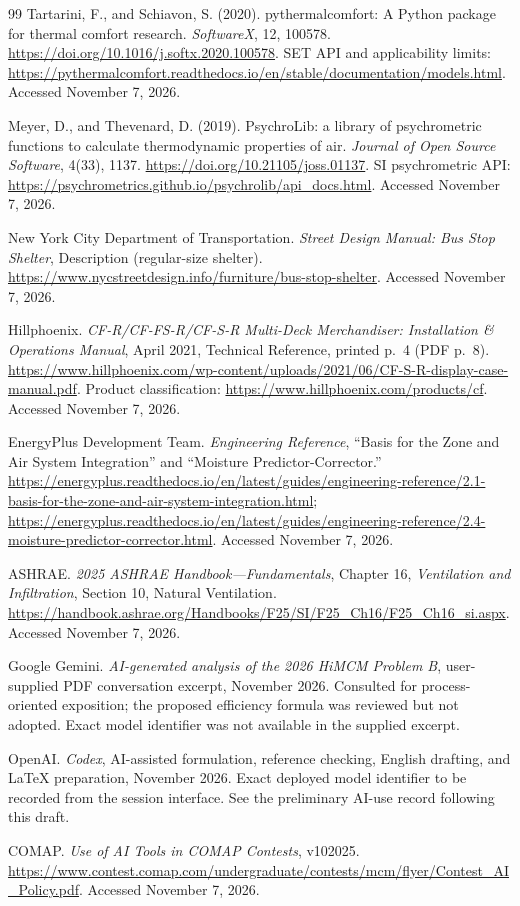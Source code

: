 \documentclass[12pt]{article}
\begin{document}
\begin{thebibliography}{99}
Tartarini, F., and Schiavon, S. (2020).
pythermalcomfort: A Python package for thermal comfort research.
\emph{SoftwareX}, 12, 100578.
\url{https://doi.org/10.1016/j.softx.2020.100578}.
SET API and applicability limits:
\url{https://pythermalcomfort.readthedocs.io/en/stable/documentation/models.html}.
Accessed November 7, 2026.

Meyer, D., and Thevenard, D. (2019).
PsychroLib: a library of psychrometric functions to calculate thermodynamic properties of air.
\emph{Journal of Open Source Software}, 4(33), 1137.
\url{https://doi.org/10.21105/joss.01137}.
SI psychrometric API:
\url{https://psychrometrics.github.io/psychrolib/api_docs.html}.
Accessed November 7, 2026.

New York City Department of Transportation.
\emph{Street Design Manual: Bus Stop Shelter}, Description (regular-size shelter).
\url{https://www.nycstreetdesign.info/furniture/bus-stop-shelter}.
Accessed November 7, 2026.

Hillphoenix. \emph{CF-R/CF-FS-R/CF-S-R Multi-Deck Merchandiser: Installation \& Operations Manual}, April 2021, Technical Reference, printed p.~4 (PDF p.~8).
\url{https://www.hillphoenix.com/wp-content/uploads/2021/06/CF-S-R-display-case-manual.pdf}.
Product classification: \url{https://www.hillphoenix.com/products/cf}.
Accessed November 7, 2026.

EnergyPlus Development Team. \emph{Engineering Reference},
``Basis for the Zone and Air System Integration'' and ``Moisture Predictor-Corrector.''
\url{https://energyplus.readthedocs.io/en/latest/guides/engineering-reference/2.1-basis-for-the-zone-and-air-system-integration.html};
\url{https://energyplus.readthedocs.io/en/latest/guides/engineering-reference/2.4-moisture-predictor-corrector.html}.
Accessed November 7, 2026.

ASHRAE. \emph{2025 ASHRAE Handbook---Fundamentals}, Chapter 16,
\emph{Ventilation and Infiltration}, Section 10, Natural Ventilation.
\url{https://handbook.ashrae.org/Handbooks/F25/SI/F25_Ch16/F25_Ch16_si.aspx}.
Accessed November 7, 2026.

Google Gemini. \emph{AI-generated analysis of the 2026 HiMCM Problem B},
user-supplied PDF conversation excerpt, November 2026.
Consulted for process-oriented exposition; the proposed efficiency formula was
reviewed but not adopted. Exact model identifier was not available in the supplied excerpt.

OpenAI. \emph{Codex}, AI-assisted formulation, reference checking,
English drafting, and LaTeX preparation, November 2026.
Exact deployed model identifier to be recorded from the session interface.
See the preliminary AI-use record following this draft.

COMAP. \emph{Use of AI Tools in COMAP Contests}, v102025.
\url{https://www.contest.comap.com/undergraduate/contests/mcm/flyer/Contest_AI_Policy.pdf}.
Accessed November 7, 2026.
\end{thebibliography}
\end{document}
